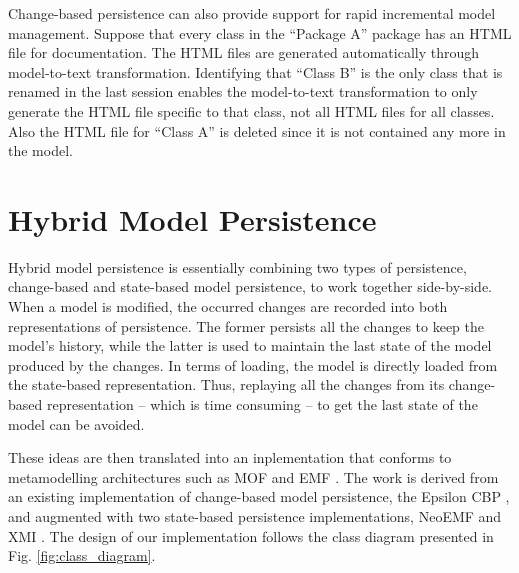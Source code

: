 \documentclass[10pt,conference]{IEEEtran}
\begin{document}
Change-based persistence can also provide support for rapid incremental model management. Suppose that every class in the ``Package A'' package has an HTML file for documentation. The HTML files are generated automatically through model-to-text transformation. Identifying that ``Class B'' is the only class that is renamed in the last session enables the model-to-text transformation to only generate the HTML file specific to that class, not all HTML files for all classes. Also the HTML file for ``Class A'' is deleted since it is not contained any more in the model.

\section{Hybrid Model Persistence}
\label{sec:hybrid_model_persistence}
Hybrid model persistence is essentially combining two types of persistence, change-based and state-based model persistence, to work together side-by-side. When a model is modified, the occurred changes are recorded into both representations of persistence. The former persists all the changes to keep the model's history, while the latter is used to maintain the last state of the model produced by the changes. In terms of loading, the model is directly loaded from the state-based representation. Thus, replaying all the changes from its change-based representation -- which is time consuming -- to get the last state of the model can be avoided.

These ideas are then translated into an inplementation that conforms to metamodelling architectures such as MOF \cite{omg2018mof} and EMF \cite{steinberg2008emf}. The work is derived from an existing implementation of change-based model persistence, the Epsilon CBP \cite{DBLP:conf/models/YohannisKP17}, and augmented with two state-based persistence implementations, NeoEMF \cite{daniel2016neoemf} and XMI \cite{omg2018xmi}. The design of our implementation follows the class diagram presented in Fig. \ref{fig:class_diagram}. 
\end{document}
